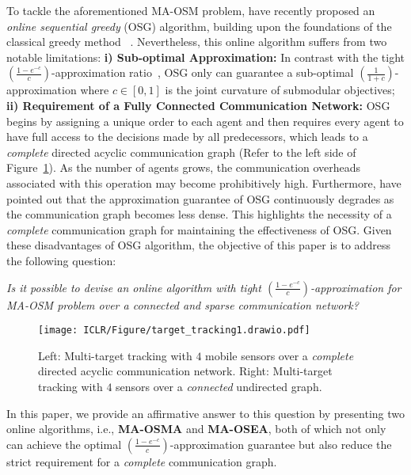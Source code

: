 	To tackle the aforementioned MA-OSM problem, \citet{xu2023online} have recently proposed an \emph{online sequential greedy} (OSG) algorithm, building upon the foundations of the classical greedy method ~\citep{fisher1978analysis}. Nevertheless, this online algorithm suffers from two notable limitations: \textbf{i) Sub-optimal Approximation:} In contrast with the tight $(\frac{1-e^{-c}}{c})$-approximation ratio~\citep{vondrak2010submodularity,bian2017guarantees}, OSG only can guarantee a sub-optimal $(\frac{1}{1+c})$-approximation where $c\in[0,1]$ is the joint curvature of submodular objectives; \textbf{ii) Requirement of a Fully Connected Communication Network:} OSG begins by assigning a unique order to each agent and then  requires every agent to have full access to the decisions made by all predecessors, which leads to a \emph{complete} directed acyclic communication graph (Refer to the left side of Figure~\ref{figue_intro_target}). As the number of agents grows, the communication overheads associated with this operation may become prohibitively high. Furthermore, \citet{grimsman2018impact} have pointed out that the approximation guarantee of OSG continuously degrades as the communication graph becomes less dense. This highlights the necessity of a \emph{complete} communication graph for maintaining the effectiveness of OSG. Given these disadvantages of OSG algorithm, the objective of this paper is to address the following  question:	\vspace{-0.6em}
	\begin{center}
		\emph{Is it possible to devise an online algorithm with tight $(\frac{1-e^{-c}}{c})$-approximation for \emph{MA-OSM} problem over a connected and sparse communication network?}
\end{center}
		\begin{figure}
		\vspace{-2.6em}
		\centering
		\texttt{[image: ICLR/Figure/target\_tracking1.drawio.pdf]}
		\caption{Left: Multi-target tracking with $4$ mobile sensors over a \emph{complete} directed acyclic communication network. Right: Multi-target tracking with $4$ sensors over a \emph{connected} undirected graph.}\label{figue_intro_target}
  	\vspace{-1.0em}
	\end{figure}
	 In this paper, we provide an affirmative answer to this question by presenting two online algorithms, i.e., \textbf{MA-OSMA} and \textbf{MA-OSEA}, both of which not only can achieve the optimal $(\frac{1-e^{-c}}{c})$-approximation guarantee but also reduce the strict requirement for a \emph{complete} communication graph. 
  
